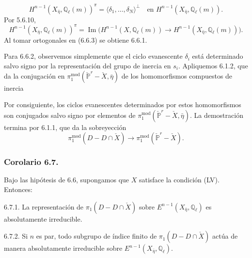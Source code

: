 \pageoriginale

\begin{equation}\tag{6.6.3}
H^{n-1}(X_{\bar\eta},\mathbb Q_\ell(m))^\pi
=\bigl\langle\delta_1,\ldots,\delta_N\bigr\rangle^\perp
\quad\text{en }H^{n-1}(X_{\bar\eta},\mathbb Q_\ell(m)).
\end{equation}
Por 5.6.10,
\begin{equation}\tag{6.6.4}
H^{n-1}(X_{\bar\eta},\mathbb Q_\ell(m))^\pi
=\operatorname{Im}\bigl(
H^{n-1}(X,\mathbb Q_\ell(m))
\longrightarrow H^{n-1}(X_{\bar\eta},\mathbb Q_\ell(m))
\bigr).
\end{equation}
Al tomar ortogonales en (6.6.3) se obtiene 6.6.1.

Para 6.6.2, observemos simplemente que el ciclo evanescente $\delta_i$
está determinado salvo signo por la representación del grupo de
inercia en $s_i$. Apliquemos 6.1.2, que da la conjugación en
$\pi_1^{\mathrm{mod}}(\check{\mathbb P}^{r}-\check X,\bar\eta)$ de los
homomorfismos compuestos de inercia
\begin{center}
\end{center}
Por consiguiente, los ciclos evanescentes determinados por estos
homomorfismos son conjugados salvo signo por elementos de
$\pi_1^{\mathrm{mod}}(\check{\mathbb P}^{r}-\check X,\bar\eta)$.
La demostración termina por 6.1.1, que da la sobreyección
\[
\pi_1^{\mathrm{mod}}(D-D\cap\check X)
\longrightarrow
\pi_1^{\mathrm{mod}}(\check{\mathbb P}^{r}-\check X).
\]

\pageoriginale

\subsubsection*{Corolario 6.7.}

Bajo las hipótesis de 6.6, supongamos que $X$ satisface la condición
(LV). Entonces:

\medskip
\noindent
\textup{6.7.1.} La representación de
$\pi_1(D-D\cap\check X)$ sobre
$E^{n-1}(X_{\bar\eta},\mathbb Q_\ell)$ es absolutamente irreducible.

\medskip
\noindent
\textup{6.7.2.} Si $n$ es par, todo subgrupo de índice finito de
$\pi_1(D-D\cap\check X)$ actúa de manera absolutamente irreducible
sobre $E^{n-1}(X_{\bar\eta},\mathbb Q_\ell)$.

